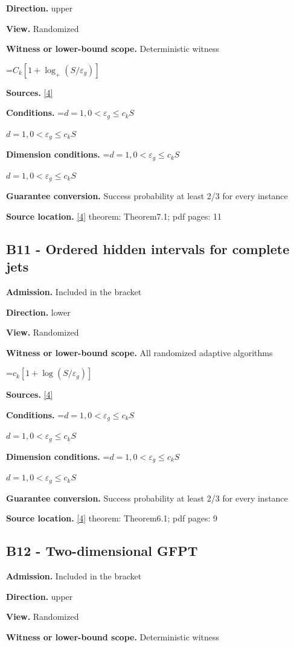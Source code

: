 \documentclass[10pt,a4paper]{article}
\newcommand{\AtlasMath}[1]{\par\begingroup\centering\setbox0=\hbox{$\displaystyle #1$}\ifdim\wd0>1.4\linewidth\typeout{ATLAS WIDE FORMULA: \the\wd0}\fi\ifdim\wd0>\linewidth\resizebox{\linewidth}{!}{\box0}\else\box0\fi\par\endgroup}
\newcommand{\AtlasInlineMath}[1]{\begingroup\setbox0=\hbox{$#1$}\ifdim\wd0>.4\linewidth\endgroup\AtlasMath{#1}\else\endgroup$#1$\fi}
\begin{document}
\textbf{Direction.} upper

\textbf{View.} Randomized

\textbf{Witness or lower-bound scope.} Deterministic witness

\AtlasMath{C_k[1+\log_+(S/\varepsilon_g)]}
\textbf{Sources.} \href{https://arxiv.org/abs/2610.16295}{[4]}

\textbf{Conditions.} \AtlasInlineMath{d=1,0<\varepsilon_g\le c_k S}

\textbf{Dimension conditions.} \AtlasInlineMath{d=1,0<\varepsilon_g\le c_k S}

\textbf{Guarantee conversion.} Success probability at least 2/3 for every instance

\textbf{Source location.} \href{https://arxiv.org/abs/2610.16295}{[4]} theorem: Theorem7.1; pdf pages: 11

\subsection{B11 - Ordered hidden intervals for complete jets}
\textbf{Admission.} Included in the bracket

\textbf{Direction.} lower

\textbf{View.} Randomized

\textbf{Witness or lower-bound scope.} All randomized adaptive algorithms

\AtlasMath{c_k[1+\log(S/\varepsilon_g)]}
\textbf{Sources.} \href{https://arxiv.org/abs/2610.16295}{[4]}

\textbf{Conditions.} \AtlasInlineMath{d=1,0<\varepsilon_g\le c_k S}

\textbf{Dimension conditions.} \AtlasInlineMath{d=1,0<\varepsilon_g\le c_k S}

\textbf{Guarantee conversion.} Success probability at least 2/3 for every instance

\textbf{Source location.} \href{https://arxiv.org/abs/2610.16295}{[4]} theorem: Theorem6.1; pdf pages: 9

\subsection{B12 - Two-dimensional GFPT}
\textbf{Admission.} Included in the bracket

\textbf{Direction.} upper

\textbf{View.} Randomized

\textbf{Witness or lower-bound scope.} Deterministic witness
\end{document}
